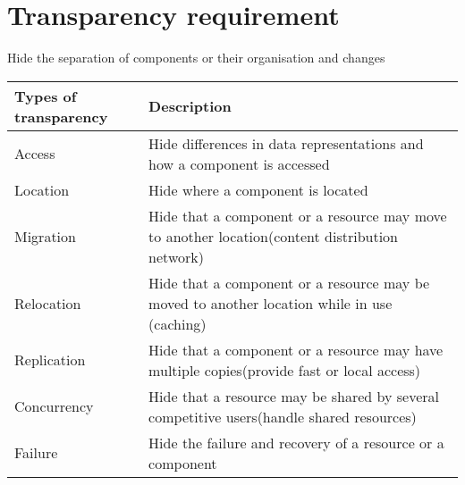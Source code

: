 \documentclass{article}[18pt]
\begin{document}
\section{Transparency requirement}
Hide the separation of components or their organisation and changes\\
\begin{tabularx}{\textwidth}{|X|X|}
	\hline
	Types of transparency& Description\\
	\hline
	Access& Hide differences in data representations and how a component is accessed\\
	\hline
	Location& Hide where a component is located\\
	\hline
	Migration&Hide that a component or a resource may move to another location(content distribution network)\\
	\hline
	Relocation& Hide that a component or a resource may be moved to another location while in use (caching)\\
	\hline
	Replication& Hide that a component or a resource may have multiple copies(provide fast or local access)\\
	\hline
	Concurrency&Hide that a resource may be shared by several competitive users(handle shared resources)\\
	\hline
	Failure&Hide the failure and recovery of a resource or a component\\
	\hline
\end{tabularx}
\end{document}
